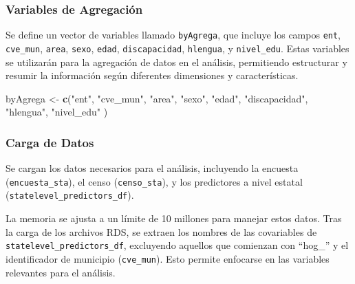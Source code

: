 \documentclass[
  12pt,
]{book}
\newenvironment{Shaded}{\begin{snugshade}}{\end{snugshade}}
\newcommand{\FunctionTok}[1]{\textcolor[rgb]{0.13,0.29,0.53}{\textbf{#1}}}
\newcommand{\NormalTok}[1]{#1}
\newcommand{\OtherTok}[1]{\textcolor[rgb]{0.56,0.35,0.01}{#1}}
\newcommand{\StringTok}[1]{\textcolor[rgb]{0.31,0.60,0.02}{#1}}
\begin{document}
\hypertarget{variables-de-agregaciuxf3n}{%
\subsubsection*{Variables de Agregación}\label{variables-de-agregaciuxf3n}}

Se define un vector de variables llamado \texttt{byAgrega}, que incluye los campos \texttt{ent}, \texttt{cve\_mun}, \texttt{area}, \texttt{sexo}, \texttt{edad}, \texttt{discapacidad}, \texttt{hlengua}, y \texttt{nivel\_edu}. Estas variables se utilizarán para la agregación de datos en el análisis, permitiendo estructurar y resumir la información según diferentes dimensiones y características.

\begin{Shaded}
\begin{Highlighting}[]
\NormalTok{byAgrega }\OtherTok{\textless{}{-}}
  \FunctionTok{c}\NormalTok{(}\StringTok{"ent"}\NormalTok{,}
    \StringTok{"cve\_mun"}\NormalTok{,}
    \StringTok{"area"}\NormalTok{,}
    \StringTok{"sexo"}\NormalTok{,}
    \StringTok{"edad"}\NormalTok{,}
    \StringTok{"discapacidad"}\NormalTok{,}
    \StringTok{"hlengua"}\NormalTok{,}
    \StringTok{"nivel\_edu"}\NormalTok{ )}
\end{Highlighting}
\end{Shaded}

\hypertarget{carga-de-datos}{%
\subsubsection*{Carga de Datos}\label{carga-de-datos}}

Se cargan los datos necesarios para el análisis, incluyendo la encuesta (\texttt{encuesta\_sta}), el censo (\texttt{censo\_sta}), y los predictores a nivel estatal (\texttt{statelevel\_predictors\_df}).

La memoria se ajusta a un límite de 10 millones para manejar estos datos. Tras la carga de los archivos RDS, se extraen los nombres de las covariables de \texttt{statelevel\_predictors\_df}, excluyendo aquellos que comienzan con ``hog\_'' y el identificador de municipio (\texttt{cve\_mun}). Esto permite enfocarse en las variables relevantes para el análisis.
\end{document}
